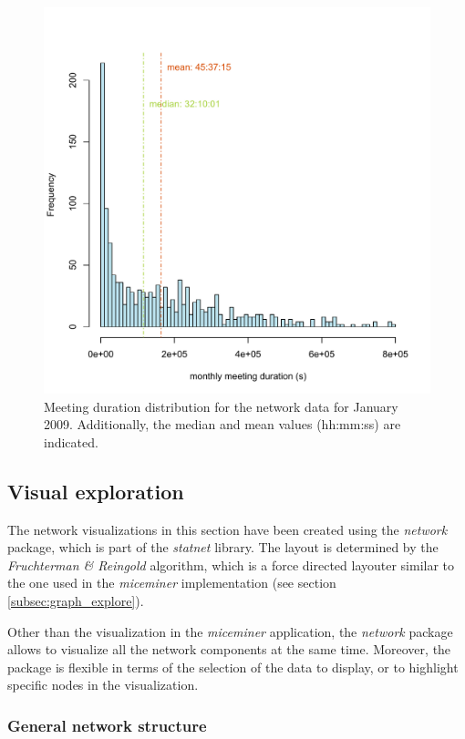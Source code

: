 \begin{figure}[htpb]
\begin{center}
  \includegraphics[width=.75\textwidth]{assets/pdf/meeting_frequency_january.pdf}
  \caption[Histogram of monthly meeting duration]{Meeting duration distribution for the network data for January 2009. Additionally, the median and mean values (hh:mm:ss) are indicated.}
  \label{fig:meeting_frequency_januray}
\end{center}
\end{figure}   

\subsection{Visual exploration}
\label{subsec:visual_exploration}

The network visualizations in this section have been created using the \textit{network}\citep{network:08} package, which is part of the \textit{statnet}\citep{statnet:03} library. The layout is determined by the \textit{Fruchterman \& Reingold}\citep{fruchterman:91} algorithm, which is a force directed layouter similar to the one used in the \textit{miceminer} implementation (see section \ref{subsec:graph_explore}).

Other than the visualization in the \textit{miceminer} application, the \textit{network} package allows to visualize all the network components at the same time. Moreover, the package is flexible in terms of the selection of the data to display, or to highlight specific nodes in the visualization.

\subsubsection{General network structure}
\label{subsubsec:vis_general}    

